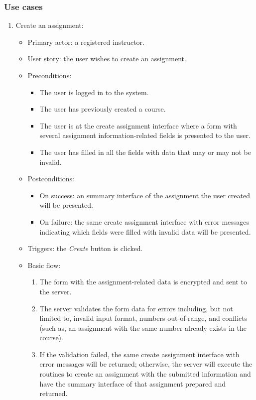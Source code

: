 \subsubsection{Use cases}
\begin{enumerate}
\item Create an assignment:
\begin{itemize}
    \item Primary actor: a registered instructor.
    \item User story: the user wishes to create an assignment.
    \item Preconditions:
        \begin{itemize}
            \item The user is logged in to the system.
            \item The user has previously created a course.
            \item The user is at the create assignment interface where a form
                with several assignment information-related fields is
                presented to the user.
            \item The user has filled in all the fields with data that may
                or may not be invalid.
        \end{itemize}
    \item Postconditions:
        \begin{itemize}
            \item On success: an summary interface of the assignment the user
                created will be presented.
            \item On failure: the same create assignment interface with error
                messages indicating which fields were filled with invalid data
                will be presented.
        \end{itemize}
    \item Triggers: the \emph{Create} button is clicked.
    \item Basic flow:
        \begin{enumerate}
            \item The form with the assignment-related data is encrypted and
                sent to the server.
            \item The server validates the form data for errors  including,
                but not limited to, invalid input format, numbers out-of-range,
                and conflicts (such as, an assignment with the same
                number already exists in the course).
            \item If the validation failed, the same create assignment interface
                with error messages will be returned; otherwise, the server will
                execute the routines to create an assignment with the submitted
                information and have the summary interface of that assignment
                prepared and returned.
        \end{enumerate}
\end{itemize}


\end{enumerate}
